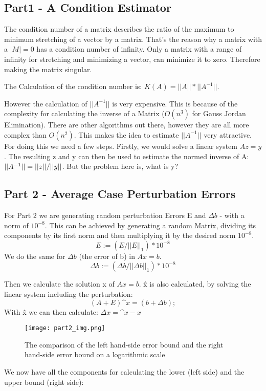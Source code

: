 \documentclass{article}
\begin{document}
\par\noindent

\subsection{Part1 - A Condition Estimator}
The condition number of a matrix describes the ratio of the maximum to minimum stretching of a vector by a matrix. That's the reason why a matrix with a \(|M| = 0\)  has a condition number of infinity.
Only a matrix with a range of infinity for stretching and minimizing a vector, can minimize it to zero. Therefore making the matrix singular.
\par\noindent
The Calculation of the condition number is:
\(K(A) = ||A|| * ||A^{-1}||\).
\par\noindent
However the calculation of \(||A^{-1}||\) is very expensive. This is because of the complexity for calculating the inverse of a Matrix ($O(n^3)$ for Gauss Jordan Elimination).
There are other algorithms out there, however they are all more complex than $O(n^2)$.
This makes the idea to estimate  \(||A^{-1}||\) very attractive. For doing this we need a few steps.
Firstly, we would solve a linear system \(A z = y\).
The resulting z and y can then be used to estimate the normed inverse of A: \(\\||A^{-1}|| =||z|| / ||y|| \).
But the problem here is, what is y? 

\subsection{Part 2 -  Average Case Perturbation Errors}
For Part 2 we are generating random perturbation Errors E and \(\Delta b\) - with a norm of \(10^{-8}\).
This can be achieved by generating a random Matrix, dividing its components by its first norm and then multiplying it by the desired norm \(10^{-8}\).
\begin{equation}
     E := (E / ||E||_1) * 10^{-8}
\end{equation}
We do the same for \(\Delta b\) (the error of b) in \(A x = b\).
\begin{equation}
     \Delta b := (\Delta b / ||\Delta b||_1) * 10^{-8}
\end{equation}
\par\noindent
Then we calculate the solution x of \(A x = b\). \^x is also calculated, by solving the linear system including the perturbation:
\begin{equation}
    (A + E)  \^x =  (b + \Delta b);
\end{equation}
With \^x we can then calculate: \(\Delta x = \^x-x\)
\begin{figure}
    \centering
    \texttt{[image: part2\_img.png]}
    \caption{The comparison of the left hand-side error bound and the right hand-side error bound on a logarithmic scale}
    \label{fig:part2_result}
\end{figure}
We now have all the components for calculating the lower (left side) and the upper bound (right side):
\end{document}
